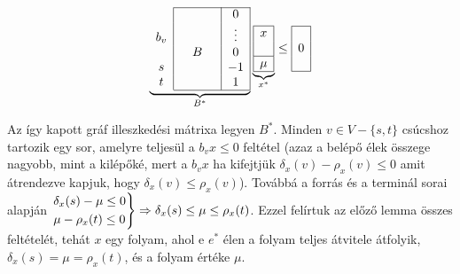 \begin{figure}
	\begin{center}
		\vspace{-1.3cm}
		\begin{displaymath}
			\underbrace{
				\begin{array}{c|ccc|c|}
					\cline{2-5}
					    &  &   &  & 0      \\
					b_v &  &   &  & \vdots \\
					    &  & B &  & 0      \\
					s   &  &   &  & -1     \\
					t   &  &   &  & 1      \\
					\cline{2-5}
				\end{array}}_{B^*}
			\underbrace{
				\begin{array}{|c|}
					\hline
					x   \\
					\\
					\hline
					\mu \\
					\hline
				\end{array}}_{x^*}
			\leq
			\begin{array}{|c|}
				\hline
				\\
				0 \\
				\\
				\hline
			\end{array}
		\end{displaymath}
		\vspace{-1.3cm}
	\end{center}
\end{figure}
Az így kapott gráf illeszkedési mátrixa legyen $B^*$. Minden $v \in V - \{s,t\}$
csúcshoz tartozik egy sor, amelyre teljesül a $b_{v}x\leq 0$ feltétel (azaz a
belépő élek összege nagyobb, mint a kilépőké, mert a $b_{v}x$ ha kifejtjük
$\delta_x(v) - \rho_x(v) \leq 0 $ amit átrendezve kapjuk, hogy $ \delta_x(v)
	\leq \rho_x(v)$).
Továbbá a forrás és a terminál sorai alapján $\begin{rcases}\delta_x(s)-\mu
		\leq 0 \\
		\mu - \rho_x(t) \leq 0\end{rcases} \Rightarrow \delta_x(s) \leq \mu \leq
	\rho_x(t)$. Ezzel felírtuk az előző lemma összes feltételét, tehát $x$ egy
folyam, ahol e $e^*$ élen a folyam teljes átvitele átfolyik,
$\delta_x(s)=\mu=\rho_x(t)$, és a folyam értéke $\mu$.

